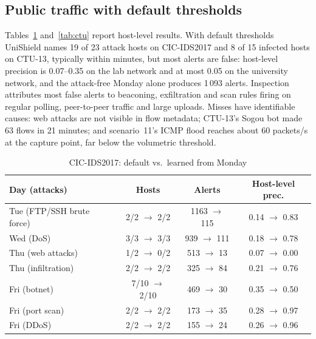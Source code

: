 \documentclass[conference]{IEEEtran}
\begin{document}
\subsection{Public traffic with default thresholds}
Tables~\ref{tab:cicids} and~\ref{tab:ctu} report host-level results. With default thresholds UniShield names 19 of 23 attack hosts on CIC-IDS2017 and 8 of 15 infected hosts on CTU-13, typically within minutes, but most alerts are false: host-level precision is 0.07--0.35 on the lab network and at most 0.05 on the university network, and the attack-free Monday alone produces 1\,093 alerts. Inspection attributes most false alerts to beaconing, exfiltration and scan rules firing on regular polling, peer-to-peer traffic and large uploads. Misses have identifiable causes: web attacks are not visible in flow metadata; CTU-13's Sogou bot made 63 flows in 21 minutes; and scenario~11's ICMP flood reaches about 60 packets/s at the capture point, far below the volumetric threshold.

\begin{table}[t]
\caption{CIC-IDS2017: default vs.\ learned from Monday}\label{tab:cicids}
\centering\footnotesize
\begin{tabular}{@{}lccc@{}}
\toprule
Day (attacks) & Hosts & Alerts & Host-level prec. \\
\midrule
Tue (FTP/SSH brute force) & 2/2 $\to$ 2/2 & 1163 $\to$ 115 & 0.14 $\to$ 0.83 \\
Wed (DoS) & 3/3 $\to$ 3/3 & 939 $\to$ 111 & 0.18 $\to$ 0.78 \\
Thu (web attacks) & 1/2 $\to$ 0/2 & 513 $\to$ 13 & 0.07 $\to$ 0.00 \\
Thu (infiltration) & 2/2 $\to$ 2/2 & 325 $\to$ 84 & 0.21 $\to$ 0.76 \\
Fri (botnet) & 7/10 $\to$ 2/10 & 469 $\to$ 30 & 0.35 $\to$ 0.50 \\
Fri (port scan) & 2/2 $\to$ 2/2 & 173 $\to$ 35 & 0.28 $\to$ 0.97 \\
Fri (DDoS) & 2/2 $\to$ 2/2 & 155 $\to$ 24 & 0.26 $\to$ 0.96 \\
\bottomrule
\end{tabular}
\end{table}
\end{document}
